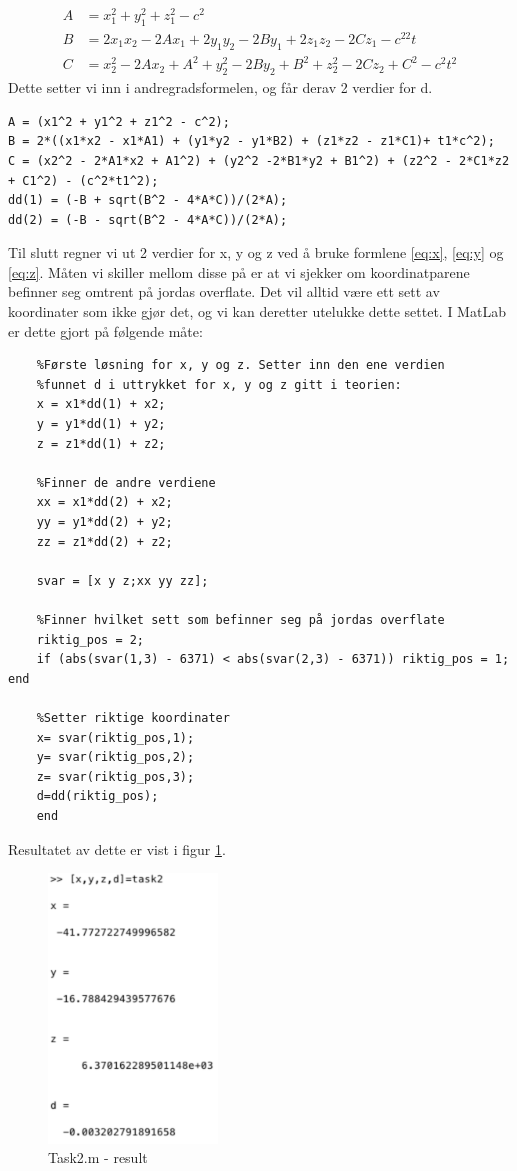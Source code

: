\begin{align}
    A&=x_1^2+y_1^2+z_1^2-c^2 \\
    B&=2x_1x_2-2Ax_1+2y_1y_2-2By_1+2z_1z_2-2Cz_1-c^22t\\
    C&=x_2^2-2Ax_2+A^2+y_2^2-2By_2+B^2+z_2^2-2Cz_2+C^2-c^2t^2
\end{align}
Dette setter vi inn i andregradsformelen, og får derav 2 verdier for d. 
\begin{lstlisting}
A = (x1^2 + y1^2 + z1^2 - c^2);
B = 2*((x1*x2 - x1*A1) + (y1*y2 - y1*B2) + (z1*z2 - z1*C1)+ t1*c^2);
C = (x2^2 - 2*A1*x2 + A1^2) + (y2^2 -2*B1*y2 + B1^2) + (z2^2 - 2*C1*z2 + C1^2) - (c^2*t1^2);
dd(1) = (-B + sqrt(B^2 - 4*A*C))/(2*A);
dd(2) = (-B - sqrt(B^2 - 4*A*C))/(2*A);
\end{lstlisting}
Til slutt regner vi ut 2 verdier for x, y og z ved å bruke formlene \ref{eq:x}, \ref{eq:y} og \ref{eq:z}. Måten vi skiller mellom disse på er at vi sjekker om koordinatparene befinner seg omtrent på jordas overflate. Det vil alltid være ett sett av koordinater som ikke gjør det, og vi kan deretter utelukke dette settet. 
I MatLab er dette gjort på følgende måte: 

\begin{lstlisting}
	%Første løsning for x, y og z. Setter inn den ene verdien 
	%funnet d i uttrykket for x, y og z gitt i teorien:
	x = x1*dd(1) + x2;
	y = y1*dd(1) + y2;
	z = z1*dd(1) + z2;

	%Finner de andre verdiene
	xx = x1*dd(2) + x2;
	yy = y1*dd(2) + y2;
	zz = z1*dd(2) + z2;

	svar = [x y z;xx yy zz]; 

	%Finner hvilket sett som befinner seg på jordas overflate
	riktig_pos = 2;
	if (abs(svar(1,3) - 6371) < abs(svar(2,3) - 6371)) riktig_pos = 1; end

	%Setter riktige koordinater
	x= svar(riktig_pos,1); 
	y= svar(riktig_pos,2); 
	z= svar(riktig_pos,3); 
	d=dd(riktig_pos); 
	end
\end{lstlisting}

Resultatet av dette er vist i figur \ref{fig:task2result}. 

\begin{figure}[h]
    \centering
    \includegraphics[width=0.4\textwidth]{sections/Exercise1/task2result.png}
    \caption{Task2.m - result}
    \label{fig:task2result}
\end{figure}